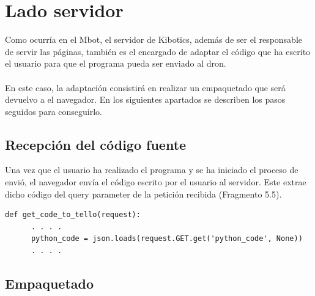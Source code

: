\documentclass{report}
\begin{document}
\section{Lado servidor}

Como ocurría en el Mbot, el servidor de Kibotics, además de ser el responsable de servir las páginas, también es el encargado de adaptar el código que ha escrito el usuario para que el programa pueda ser enviado al dron. 
\\
\\
En este caso, la adaptación consistirá en realizar un empaquetado que será devuelvo a el navegador. En los siguientes apartados se describen los pasos seguidos para conseguirlo.

\subsection{Recepción del código fuente}

Una vez que el usuario ha realizado el programa y se ha iniciado el proceso de envió, el navegador envía el código escrito por el usuario al servidor. Este extrae dicho código del query parameter de la petición recibida (Fragmento 5.5). 
\\
\begin{lstlisting}[frame=single,breaklines=true, label=Extracción programa en el servidor, caption=Extracción programa en el servidor, captionpos=b]
   def get_code_to_tello(request):
      . . . .
      python_code = json.loads(request.GET.get('python_code', None))
      . . . .

\end{lstlisting}


\subsection{Empaquetado}
\end{document}
